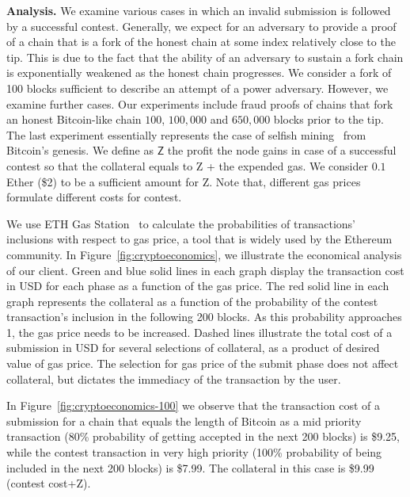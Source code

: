\noindent \textbf{Analysis.} We examine various cases in which an invalid
submission is followed by a successful contest. Generally, we expect for an
adversary to provide a proof of a chain that is a fork of the honest chain at
some index relatively close to the tip. This is due to the fact that the
ability of an adversary to sustain a fork chain is exponentially weakened as
the honest chain progresses. We consider a fork of 100 blocks sufficient to
describe an attempt of a power adversary. However, we examine further cases.
Our experiments include fraud proofs of chains that fork an honest Bitcoin-like
chain $100$, $100{,}000$ and $650{,}000$ blocks prior to the tip. The last
experiment essentially represents the case of selfish mining~\cite{selfish}
from Bitcoin's genesis. We define as $\textsf{Z}$ the profit the node gains in
case of a successful contest so that the collateral equals to \textsf{Z} + the
expended gas. We consider $0.1$ Ether (\$2) to be a sufficient amount for
\textsf{Z}. Note that, different gas prices formulate different costs for
contest.

We use ETH Gas Station~\cite{eth-gas-station} to calculate the probabilities of
transactions' inclusions with respect to gas price, a tool that is widely used
by the Ethereum community. In Figure~\ref{fig:cryptoeconomics}, we illustrate
the economical analysis of our client. Green and blue solid lines in each graph
display the transaction cost in USD for each phase as a function of the gas
price. The red solid line in each graph represents the collateral as a function
of the probability of the contest transaction's inclusion in the following 200
blocks. As this probability approaches 1, the gas price needs to be increased.
Dashed lines illustrate the total cost of a submission in USD for several
selections of collateral, as a product of desired value of gas price. The
selection for gas price of the submit phase does not affect collateral, but
dictates the immediacy of the transaction by the user.

In Figure~\ref{fig:cryptoeconomics-100} we observe that the transaction cost of
a submission for a chain that equals the length of Bitcoin as a mid priority
transaction (80\% probability of getting accepted in the next 200 blocks) is
\$9.25, while the contest transaction in very high priority (100\% probability
of being included in the next 200 blocks) is \$7.99. The collateral in this
case is \$9.99 (contest cost+\textsf{Z}).

